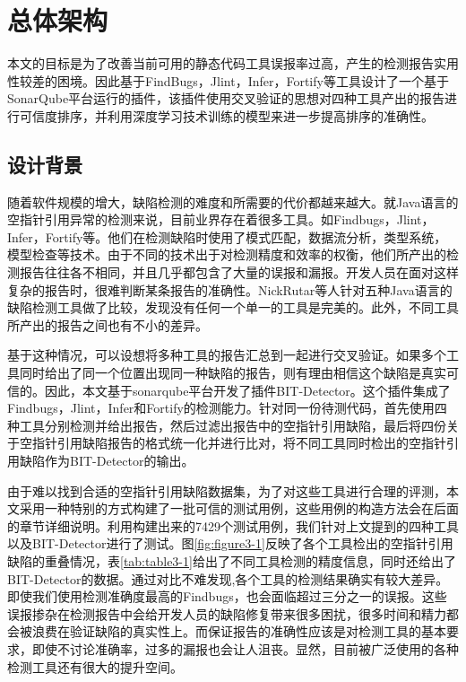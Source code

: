 \chapter{总体架构}

本文的目标是为了改善当前可用的静态代码工具误报率过高，产生的检测报告实用性较差的困境。因此基于FindBugs，Jlint，Infer，Fortify等工具设计了一个基于SonarQube平台运行的插件，该插件使用交叉验证的思想对四种工具产出的报告进行可信度排序，并利用深度学习技术训练的模型来进一步提高排序的准确性。

\section{设计背景}
随着软件规模的增大，缺陷检测的难度和所需要的代价都越来越大。就Java语言的空指针引用异常的检测来说，目前业界存在着很多工具。如Findbugs，Jlint，Infer，Fortify等。他们在检测缺陷时使用了模式匹配，数据流分析，类型系统，模型检查等技术。由于不同的技术出于对检测精度和效率的权衡，他们所产出的检测报告往往各不相同，并且几乎都包含了大量的误报和漏报。开发人员在面对这样复杂的报告时，很难判断某条报告的准确性。NickRutar\cite{rutar2004comparison}等人针对五种Java语言的缺陷检测工具做了比较，发现没有任何一个单一的工具是完美的。此外，不同工具所产出的报告之间也有不小的差异。

基于这种情况，可以设想将多种工具的报告汇总到一起进行交叉验证。如果多个工具同时给出了同一个位置出现同一种缺陷的报告，则有理由相信这个缺陷是真实可信的。因此，本文基于sonarqube平台开发了插件BIT-Detector。这个插件集成了Findbugs，Jlint，Infer和Fortify的检测能力。针对同一份待测代码，首先使用四种工具分别检测并给出报告，然后过滤出报告中的空指针引用缺陷，最后将四份关于空指针引用缺陷报告的格式统一化并进行比对，将不同工具同时检出的空指针引用缺陷作为BIT-Detector的输出。

由于难以找到合适的空指针引用缺陷数据集，为了对这些工具进行合理的评测，本文采用一种特别的方式构建了一批可信的测试用例，这些用例的构造方法会在后面的章节详细说明。利用构建出来的7429个测试用例，我们针对上文提到的四种工具以及BIT-Detector进行了测试。图\ref{fig:figure3-1}反映了各个工具检出的空指针引用缺陷的重叠情况，表\ref{tab:table3-1}给出了不同工具检测的精度信息，同时还给出了BIT-Detector的数据。通过对比不难发现,各个工具的检测结果确实有较大差异。即使我们使用检测准确度最高的Findbugs，也会面临超过三分之一的误报。这些误报掺杂在检测报告中会给开发人员的缺陷修复带来很多困扰，很多时间和精力都会被浪费在验证缺陷的真实性上。而保证报告的准确性应该是对检测工具的基本要求，即使不讨论准确率，过多的漏报也会让人沮丧。显然，目前被广泛使用的各种检测工具还有很大的提升空间。


